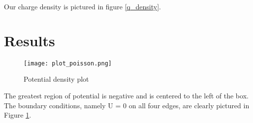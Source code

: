 \documentclass{article}
\begin{document}
Our charge density is pictured in figure \ref{q_density}.

\section{Results}


\begin{figure}[H]
  \begin{center}
  \texttt{[image: plot\_poisson.png]}
  \caption{\label{potential_plot} Potential density plot}
\end{center}
\end{figure}

The greatest region of potential is negative and is centered to the left of the box. The boundary conditions, namely U = 0 on all four edges, are clearly pictured in Figure \ref{potential_plot}.
\end{document}
